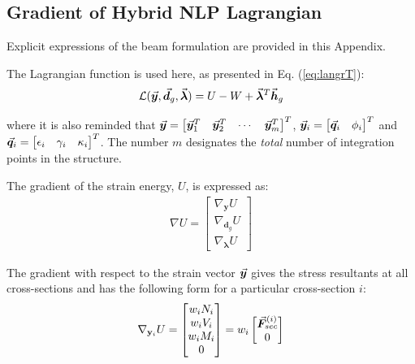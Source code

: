 \begin{appendices}
\chapter{Gradient of Hybrid NLP Lagrangian}\label{appendix:A}

Explicit expressions of the beam formulation are provided in this
Appendix. 

The Lagrangian function is used here, as presented in Eq.
(\ref{eq:langrT}):
\begin{gather}
	\mathcal{L}(\vec{\bm{y}}, \vec{\bm{d}}_g,\vec{\bm{\lambda}}) =
	U-W+\vec{\bm{\lambda}}^T\vec{\bm{h}}_g
	\label{eq:globalL}
\end{gather}

\noindent where it is also reminded that $\vec{\bm{y}} = \begin{bmatrix}
	\vec{\bm{y}}_1^T & \vec{\bm{y}}_2^T & \cdots & \vec{\bm{y}}_m^T
\end{bmatrix}^T$, $\vec{\bm{y}}_i = \begin{bmatrix}
	\vec{\bm{q}}_i & \phi_i
\end{bmatrix}^T$ and $\vec{\bm{q}}_i = \begin{bmatrix}
	\epsilon_i & \gamma_i & \kappa_i
\end{bmatrix}^T$. The number $m$ designates the \emph{total} number of
integration points in the structure.

The gradient of the strain energy, $U$, is expressed as:
\begin{gather}
	\nabla U = \begin{bmatrix}
		\nabla_{\mathbf{y}}U\\ \nabla_{\mathbf{d}_g}U\\ 
		\nabla_{\mathbf{\lambda}}U
	\end{bmatrix}\nonumber
\end{gather}

\noindent The gradient with respect to the strain vector $\vec{\bm{y}}$ gives the
stress resultants at all cross-sections and has the following form for a
particular cross-section $i$:
\begin{gather}
	\nabla_{\mathbf{y}_i}U = \begin{bmatrix}
		w_iN_i\\ w_iV_i\\ w_iM_i\\ 0
	\end{bmatrix} = w_i\begin{bmatrix}
		\vec{\bm{F}}_{sec}^{(i)}\\ 0
	\end{bmatrix}
	\label{eq:straingrad}
\end{gather}


\end{appendices}
